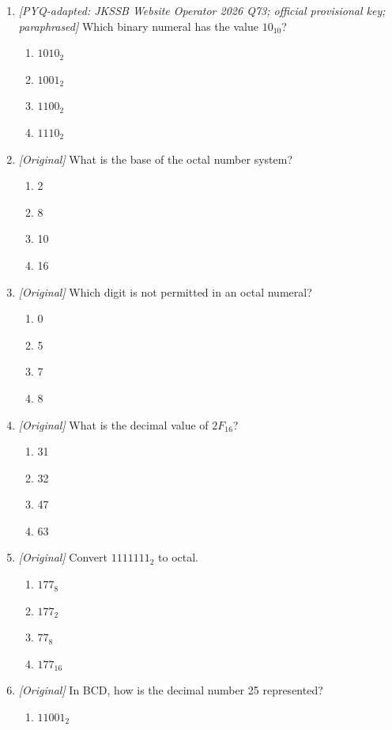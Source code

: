\begin{enumerate}[label=\textbf{Q\arabic*.}, leftmargin=*]
\item \textit{[PYQ-adapted: JKSSB Website Operator 2026 Q73; official
provisional key; paraphrased]} Which binary numeral has the value
$10_{10}$?
  \begin{enumerate}[label=\Alph*.]
    \item $1010_2$
    \item $1001_2$
    \item $1100_2$
    \item $1110_2$
  \end{enumerate}
\item \textit{[Original]} What is the base of the octal number system?
  \begin{enumerate}[label=\Alph*.]
    \item 2
    \item 8
    \item 10
    \item 16
  \end{enumerate}
\item \textit{[Original]} Which digit is not permitted in an octal numeral?
  \begin{enumerate}[label=\Alph*.]
    \item 0
    \item 5
    \item 7
    \item 8
  \end{enumerate}
\item \textit{[Original]} What is the decimal value of $2F_{16}$?
  \begin{enumerate}[label=\Alph*.]
    \item 31
    \item 32
    \item 47
    \item 63
  \end{enumerate}
\item \textit{[Original]} Convert $1111111_2$ to octal.
  \begin{enumerate}[label=\Alph*.]
    \item $177_8$
    \item $177_2$
    \item $77_8$
    \item $177_{16}$
  \end{enumerate}
\item \textit{[Original]} In BCD, how is the decimal number 25 represented?
  \begin{enumerate}[label=\Alph*.]
    \item $11001_2$

\end{enumerate}
\end{enumerate}
